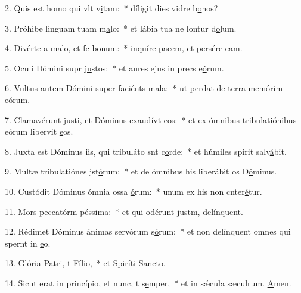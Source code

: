 2. Quis est homo qui vlt v\uline{i}tam:~* díligit dies vidre b\uline{o}nos?\par 
3. Próhibe linguam tuam  m\uline{a}lo:~* et lábia tua ne lontur d\uline{o}lum.\par 
4. Divérte a malo, et fc b\uline{o}num:~* inquíre pacem, et persére \uline{e}am.\par 
5. Oculi Dómini supr j\uline{u}stos:~* et aures ejus in precs e\uline{ó}rum.\par 
6. Vultus autem Dómini super faciénts m\uline{a}la:~* ut perdat de terra memórim e\uline{ó}rum.\par 
7. Clamavérunt justi, et Dóminus exaudívt \uline{e}os:~* et ex ómnibus tribulatiónibus eórum libervit \uline{e}os.\par 
8. Juxta est Dóminus iis, qui tribuláto snt c\uline{o}rde:~* et húmiles spírit salv\uline{á}bit.\par 
9. Multæ tribulatiónes jst\uline{ó}rum:~* et de ómnibus his liberábit os D\uline{ó}minus.\par 
10. Custódit Dóminus ómnia ossa \uline{ó}rum:~* unum ex his non cnter\uline{é}tur.\par 
11. Mors peccatórm p\uline{é}ssima:~* et qui odérunt justm, del\uline{í}nquent.\par 
12. Rédimet Dóminus ánimas servórum s\uline{ó}rum:~* et non delínquent omnes qui spernt in \uline{e}o.\par 
13. Glória Patri, t F\uline{í}lio,~* et Spiríti S\uline{a}ncto.\par 
14. Sicut erat in princípio, et nunc, t s\uline{e}mper,~* et in sǽcula sæculrum. \uline{A}men.\par 
